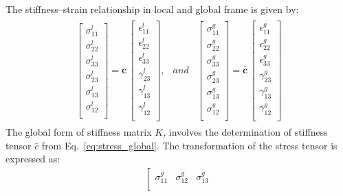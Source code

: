 \documentclass[a4paper,12pt]{article}
\begin{document}
{The stiffness--strain relationship in local and global frame is given by:
\begin{eqnarray}
\begin{array}{ccc}
\left [
\begin{array}{c}
\sigma^l_{11}\\
\sigma^l_{22}\\ 
\sigma^l_{33}\\ 
\sigma^l_{23}\\
\sigma^l_{13}\\
\sigma^l_{12}\\
\end{array}
\right ]=
\textbf{c}\,\left [
\begin{array}{c}
\epsilon^l_{11}\\
\epsilon^l_{22}\\ 
\epsilon^l_{33}\\
\gamma^l_{23}\\
\gamma^l_{13}\\
\gamma^l_{12}\\
\end{array}
\right ], & and &
\left [
\begin{array}{c}
\sigma^g_{11}\\
\sigma^g_{22}\\ 
\sigma^g_{33}\\ 
\sigma^g_{23}\\
\sigma^g_{13}\\
\sigma^g_{12}\\
\end{array}
\right ]=
\bar{\textbf{c}}\,\left [
\begin{array}{c}
\epsilon^g_{11}\\
\epsilon^g_{22}\\ 
\epsilon^g_{33}\\
\gamma^g_{23}\\
\gamma^g_{13}\\
\gamma^g_{12}\\
\end{array}
\right ]
\end{array}
\label{eq:stress_global}
\end{eqnarray}
The global form of stiffness matrix \(K\), involves the determination of stiffness tensor \(\bar{c}\) from Eq.~\ref{eq:stress_global}.
The transformation of the stress tensor is expressed as:
\begin{eqnarray}
\left [ 
\begin{array}{ccc}
\sigma^g_{11} & \sigma^g_{12} & \sigma^g_{13}\\

\end{array}
\end{eqnarray}}
\end{document}
